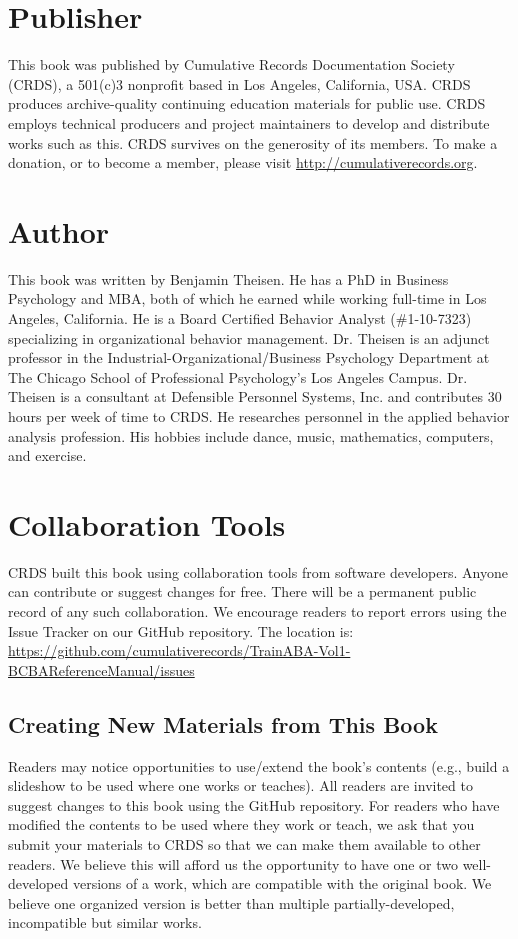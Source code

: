 \documentclass[float=false, crop=false]{standalone}
\begin{document}
\section{Publisher}
This book was published by Cumulative Records Documentation Society (CRDS), a 501(c)3 nonprofit based in Los Angeles, California, USA. CRDS produces archive-quality continuing education materials for public use. CRDS employs technical producers and project maintainers to develop and distribute works such as this. CRDS survives on the generosity of its members. To make a donation, or to become a member, please visit \url{http://cumulativerecords.org}.

\section{Author}
This book was written by Benjamin Theisen. He has a PhD in Business Psychology and MBA, both of which he earned while working full-time in Los Angeles, California. He is a Board Certified Behavior Analyst (\#1-10-7323) specializing in organizational behavior management. Dr. Theisen is an adjunct professor in the Industrial-Organizational/Business Psychology Department at The Chicago School of Professional Psychology's Los Angeles Campus. Dr. Theisen is a consultant at Defensible Personnel Systems, Inc. and contributes 30 hours per week of time to CRDS. He researches personnel in the applied behavior analysis profession. His hobbies include dance, music, mathematics, computers, and exercise.

\section{Collaboration Tools}
CRDS built this book using collaboration tools from software developers. Anyone can contribute or suggest changes for free. There will be a permanent public record of any such collaboration. We encourage readers to report errors using the Issue Tracker on our GitHub repository. The location is: \url{https://github.com/cumulativerecords/TrainABA-Vol1-BCBAReferenceManual/issues}

\subsection{Creating New Materials from This Book}
Readers may notice opportunities to use/extend the book's contents (e.g., build a slideshow to be used where one works or teaches). All readers are invited to suggest changes to this book using the GitHub repository. For readers who have modified the contents to be used where they work or teach, we ask that you submit your materials to CRDS so that we can make them available to other readers. We believe this will afford us the opportunity to have one or two well-developed versions of a work, which are compatible with the original book. We believe one organized version is better than multiple partially-developed, incompatible but similar works. 
\end{document}
